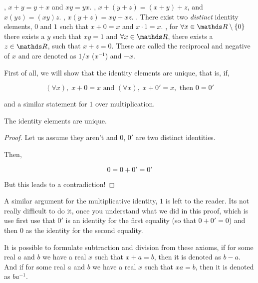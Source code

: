 \begin{axioms}
    \ii {}, \(x+y = y+x\) and \(xy = yx\).
    \ii {}, \(x + (y+z) = (x+y) + z\), and \(x(yz) = (xy)z\).
    \ii {}, \(x(y + z) = xy + xz\).
    \ii {}. There exist two \emph{distinct} identity elements, \(0\) and \(1\) such that \(x + 0 = x\) and \(x \cdot 1 = x\).
    \ii {}, for \(\forall x \in \RR \setminus \{0\}\) there exists a \(y\) such that \(xy = 1\) and \(\forall x \in \RR\),
    there exists a \(z \in \RR\), such that \(x + z = 0\). These are called the reciprocal 
    and negative of \(x\) and are denoted as \(1/x\)  (\(x^{-1}\)) and \(-x\).
\end{axioms}
 
First of all, we will show that the identity elements are unique, that is, if,

\begin{equation*}
    (\forall x),\; x + 0 = x \text{ and } (\forall x),\; x + 0' = x, \text{ then } 0 = 0'
\end{equation*}

and a similar statement for \(1\) over multiplication.

\begin{proposition}
    The identity elements are unique.
\end{proposition}

\begin{proof}
    Let us assume they aren't and \(0\), \(0'\) are two distinct identities.

    Then, 

    \begin{equation*}
        0 = 0 + 0' = 0'
    \end{equation*}

    But this leads to a contradiction! \lightning
\end{proof}


A similar argument for the multiplicative identity, \(1\) is left to the reader. Its 
not really difficult to do it, once you understand what we did in this proof, which is 
use first use that \(0'\) is an identity for the first equality (so that \(0 + 0' = 0\)) 
and then \(0\) as the identity for the second equality. 

It is possible to formulate subtraction and division from these axioms, if for some real \(a\) and \(b\) we have a real
\(x\) such that \(x + a = b\), then it is denoted as \(b - a\). 
And if for some real \(a\) and \(b\) we have a real \(x\) such that \(xa = b\), then it is denoted as \(ba^{-1}\). 

